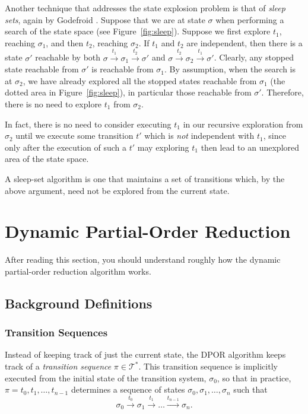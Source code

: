 \documentclass[12pt,a4paper,twoside,openany]{report}
\begin{document}
Another technique that addresses
the state explosion problem is
that of \emph{sleep sets}, again by Godefroid \cite{god91}.
Suppose that
we are at state $\sigma$ when performing a search
of the state space (see Figure~\ref{fig:sleep}).
Suppose we first explore $t_1$, reaching $\sigma_1$,
and then $t_2$, reaching $\sigma_2$.
If $t_1$ and $t_2$ are independent, then there
is a state $\sigma'$ reachable by both
$\sigma \xrightarrow{t_1} \sigma_1
\xrightarrow{t_2} \sigma'$ and
$\sigma \xrightarrow{t_2} \sigma_2
\xrightarrow{t_1} \sigma'$.
Clearly, any stopped state reachable from $\sigma'$
is reachable from $\sigma_1$. By assumption,
when the search is at $\sigma_2$, we have already
explored all the stopped states reachable from
$\sigma_1$ (the dotted area in Figure~\ref{fig:sleep}),
in particular those reachable from
$\sigma'$. Therefore, there is no need to
explore $t_1$ from $\sigma_2$.

In fact, there is no need to consider executing
$t_1$ in our recursive exploration from $\sigma_2$
until we execute some transition $t'$ which is
\emph{not} independent with $t_1$, since only after
the execution of such a $t'$ may exploring $t_1$
then lead to an unexplored area of the state space.

A sleep-set algorithm is one that maintains a
set of transitions which, by the above argument,
need not be explored from the current state.

\section{Dynamic Partial-Order Reduction}
\label{sec:dpor-prep}
After reading this section, you should
understand roughly how the dynamic
partial-order reduction algorithm works.

\subsection{Background Definitions}

\subsubsection{Transition Sequences}
Instead of keeping track of just the current state,
the DPOR algorithm
keeps track of a \emph{transition
sequence} $\pi \in \mathcal{T}^*$. This transition
sequence is implicitly executed from the initial state of
the transition system, $\sigma_0$, so that in practice,
$\pi = t_0, t_1, \ldots, t_{n-1}$ determines a sequence of states
$\sigma_0, \sigma_1, \ldots, \sigma_n$ such that
\[
	\sigma_0 \xrightarrow{\ t_0\ } \sigma_1 \xrightarrow{\ t_1\ }
	\ldots \xrightarrow{t_{n-1}} \sigma_n.
\]
\end{document}
